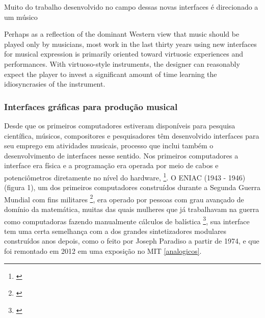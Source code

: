Muito do trabalho desenvolvido no campo dessas novas interfaces é direcionado a um músico  

\begin{citacao}
Perhaps as a reflection of the dominant Western view that music should be played only by musicians, most work in the last thirty years using new interfaces for musical expression is primarily oriented toward virtuosic experiences and performances. With virtuoso-style instruments, the designer can reasonably expect the player to invest a significant amount of time learning the idiosyncrasies of the instrument. \cite{Blaine2003}
\end{citacao}



\subsubsection{Interfaces gráficas para produção musical}

Desde que os primeiros computadores estiveram disponíveis para pesquisa científica, músicos, compositores e pesquisadores têm desenvolvido interfaces para seu emprego em atividades musicais, processo que inclui também o desenvolvimento de interfaces nesse sentido. Nos primeiros computadores a interface era física e a programação era operada por meio de cabos e potenciômetros diretamente no nível do hardware, \footnote{\cite[110]{Henrique1996}}. O ENIAC (1943 - 1946) (figura 1), um dos primeiros computadores construídos durante a Segunda Guerra Mundial com fins militares \footnote{\cite[24]{Stolfi}}, era operado por pessoas com grau avançado de domínio da matemática, muitas das quais mulheres que já trabalhavam na guerra como computadoras fazendo manualmente cálculos de balística \footnote{\cite{HayleyWilliams2015}}, sua interface tem uma certa semelhança com a dos grandes sintetizadores modulares construídos anos depois, como o feito por Joseph Paradiso a partir de 1974, e que foi remontado em 2012 em uma exposição no MIT \ref{analogicos}. 

